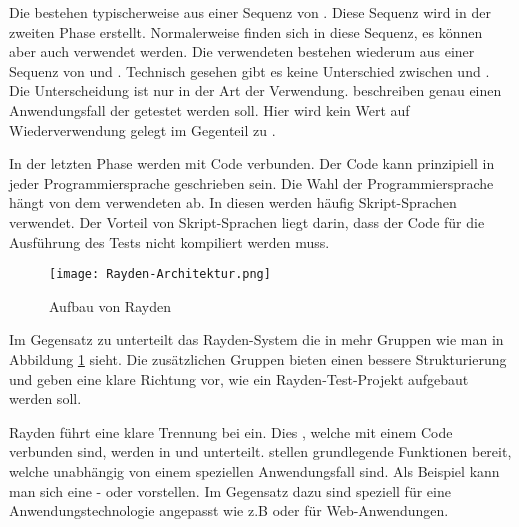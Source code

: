 \SuperPar
Die  bestehen typischerweise aus einer Sequenz von . Diese Sequenz wird in der zweiten Phase erstellt. Normalerweise finden sich  in diese Sequenz, es können aber auch  verwendet werden. Die verwendeten  bestehen wiederum aus einer Sequenz von  und . Technisch gesehen gibt es keine Unterschied zwischen  und . Die Unterscheidung ist nur in der Art der Verwendung.  beschreiben genau einen Anwendungsfall der getestet werden soll. Hier wird kein Wert auf Wiederverwendung gelegt im Gegenteil zu .

\SuperPar
In der letzten Phase werden  mit Code verbunden. Der Code kann prinzipiell in jeder Programmiersprache geschrieben sein. Die Wahl der Programmiersprache hängt von dem verwendeten  ab. In diesen  werden häufig Skript-Sprachen verwendet. Der Vorteil von Skript-Sprachen liegt darin, dass der Code für die Ausführung des Tests nicht kompiliert werden muss.

\begin{figure}[h]
\centering
\texttt{[image: Rayden-Architektur.png]}
\caption{Aufbau von Rayden}
\label{fig:rayden-arch}
\end{figure}

\SuperPar
Im Gegensatz zu  unterteilt das Rayden-System die  in mehr Gruppen wie man in Abbildung \ref{fig:rayden-arch} sieht. Die zusätzlichen Gruppen bieten einen bessere Strukturierung und geben eine klare Richtung vor, wie ein Rayden-Test-Projekt aufgebaut werden soll.    

\SuperPar
Rayden führt eine klare Trennung bei  ein. Dies , welche mit einem Code verbunden sind, werden in  und  unterteilt.  stellen grundlegende Funktionen bereit, welche unabhängig von einem speziellen Anwendungsfall sind. Als Beispiel kann man sich eine - oder  vorstellen. Im Gegensatz dazu sind  speziell für eine Anwendungstechnologie angepasst wie z.B  oder  für Web-Anwendungen. 

